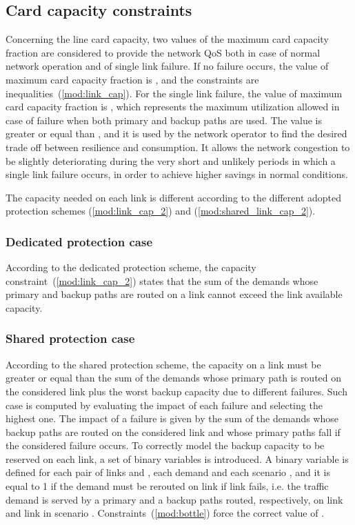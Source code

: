 \documentclass[final,5p,times,twocolumn]{elsarticle}
\begin{document}
\subsection{Card capacity constraints}
Concerning the line card capacity, two values of the maximum card capacity fraction are considered to provide the network QoS both in case of normal network operation and of single link failure.
 If no failure occurs, the value of maximum card capacity fraction is , and the constraints are inequalities~(\ref{mod:link_cap}). For the single link failure, the value of maximum card capacity fraction is , which represents the maximum utilization allowed in case of failure when both primary and backup paths are used. The value  is greater or equal than , and it is used by the network operator to find the desired trade off between resilience and consumption. It allows the network congestion to be slightly deteriorating during the very short and unlikely periods in which a single link failure occurs, in order to achieve higher savings in normal conditions.

The capacity needed on each link is different according to the different adopted protection schemes (\ref{mod:link_cap_2}) and (\ref{mod:shared_link_cap_2}). 

\subsubsection{Dedicated protection case}
 
According to the dedicated protection scheme, the capacity constraint~(\ref{mod:link_cap_2}) states that the sum of the demands whose primary and backup paths are routed on a link cannot exceed the link available capacity.





\subsubsection{Shared protection case}
According to the shared protection scheme, the capacity on a link must be greater or equal than the sum of the demands whose primary path is routed on the considered link plus the worst backup capacity due to different failures. Such case is computed by evaluating the impact of each failure and selecting the highest one. The impact of a failure is given by the sum of the demands whose backup paths are routed on the considered link and whose primary paths fall if the considered failure occurs.
To correctly model the backup capacity to be reserved on each link, a set of binary variables  is introduced. A binary variable  is defined for each pair of links  and , each demand  and each scenario , and it is equal to 1 if the demand must be rerouted on link  if link  fails, i.e. the traffic demand  is served by a primary and a backup paths routed, respectively, on link  and link  in scenario . Constraints~(\ref{mod:bottle}) force the correct value of .
\end{document}
